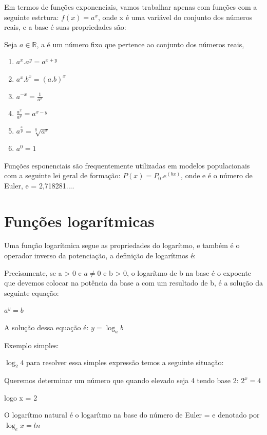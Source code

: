 \begin{multicols*}{2}
    Em termos de funções exponenciais, vamos trabalhar apenas com funções com a seguinte estrtura:
    $f(x) = a^x$, onde x é uma variável do conjunto dos números reais, e a base é suas propriedades 		são:

    Seja $a \in \mathbb{R}$, a é um número fixo que pertence ao conjunto dos números reais,
    \begin{enumerate}
        \item $a^{x}.a^{y} = a^{x+y}$
        \item $a^x.b^x = (a.b)^{x}$
        \item $a^{-x} = \frac{1}{a^x}$
        \item $\frac{a^x}{a^y} = a^{x - y}$
        \item $ a^{\frac{x}{y}}  = \sqrt[y]{a^x}$
        \item $a^0 = 1$
    \end{enumerate}

    Funções esponenciais são frequentemente utilizadas em modelos populacionais com a seguinte lei 			geral de formação: $P(x) = P_0 . e^{(bx)}$, onde e é o número de Euler, e = 2,718281....


    \section*{Funções logarítmicas}
    Uma função logarítmica segue as propriedades do logarítmo, e também é o operador inverso da 			potenciação, a definição de logarítmos é:

    \begin{theorem}
        Precisamente, se a > 0 e $a \ne 0$  e b > 0, o logarítmo de b na base é o expoente que 				devemos colocar na potência da base a com um resultado de b, é a solução da seguinte equação:

        $a^{y} = b$

        A solução dessa equação é: $y = \log_a b$

    \end{theorem}

    Exemplo simples:

    $\log_2 4 $ para resolver essa simples expressão temos a seguinte situação:

    Queremos determinar um número que quando elevado seja 4 tendo base 2: $2^x = 4$

    logo x = 2

    O logarítmo natural é o logarítmo na base do número de Euler = e denotado por $\log_e x = ln$


\end{multicols*}
